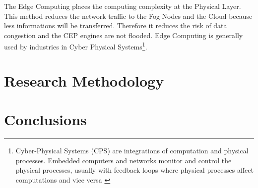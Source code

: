 \documentclass[11pt]{article}
\begin{document}
The Edge Computing places the computing complexity at the Physical Layer. This method reduces the network traffic to the Fog Nodes and the Cloud because less informations will be transferred. Therefore it reduces the risk of data congestion and the CEP engines are not flooded. Edge Computing is generally used by industries in Cyber Physical Systems\footnote{Cyber-Physical Systems (CPS) are integrations of computation and physical processes. Embedded computers and networks monitor and control the physical processes, usually with feedback loops where physical processes affect computations and vice versa \cite{5}}.

\newpage


\section{Research Methodology}



\section{Conclusions}

\listoffigures

\printbibliography
\end{document}
